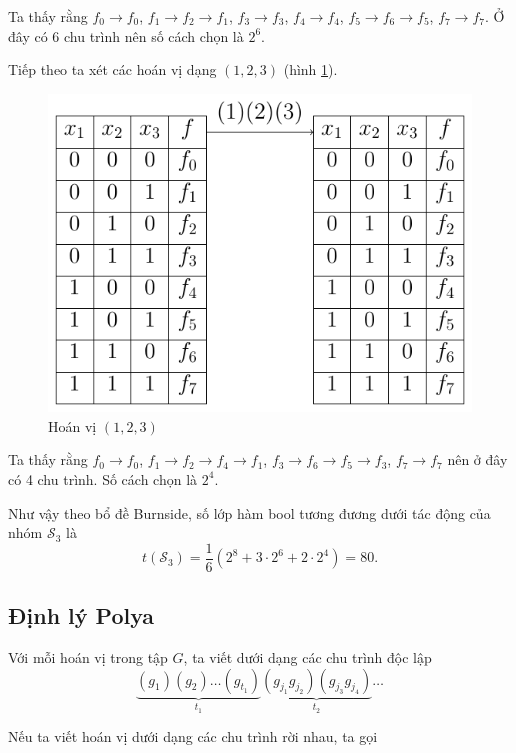 Ta thấy rằng $f_0 \to f_0$, $f_1 \to f_2 \to f_1$, $f_3 \to f_3$, $f_4 \to f_4$, $f_5 \to f_6 \to f_5$, $f_7 \to f_7$. Ở đây có 6 chu trình nên số cách chọn là $2^6$.

Tiếp theo ta xét các hoán vị dạng $(1, 2, 3)$ (hình \ref{burnside:third}).

\begin{figure}[ht]
    \centering
    \includegraphics[page=3]{figures/burnside.pdf}
    \caption{Hoán vị $(1, 2, 3)$}
    \label{burnside:third}
\end{figure}

Ta thấy rằng $f_0 \to f_0$, $f_1 \to f_2 \to f_4 \to f_1$, $f_3 \to f_6 \to f_5 \to f_3$, $f_7 \to f_7$ nên ở đây có 4 chu trình. Số cách chọn là $2^4$.

Như vậy theo bổ đề Burnside, số lớp hàm bool tương đương dưới tác động của nhóm $\mathcal{S}_3$ là \[ t (\mathcal{S}_3) = \dfrac{1}{6}(2^8 + 3 \cdot 2^6 + 2 \cdot 2^4) = 80. \]

\subsection*{Định lý Polya}

Với mỗi hoán vị trong tập $G$, ta viết dưới dạng các chu trình độc lập
\begin{equation*}
    \underbrace{(g_1) (g_2) \ldots (g_{t_{1}})}_{t_1} \underbrace{(g_{j_1} g_{j_2}) (g_{j_3} g_{j_4})}_{t_2} \ldots
\end{equation*}

Nếu ta viết hoán vị dưới dạng các chu trình rời nhau, ta gọi

